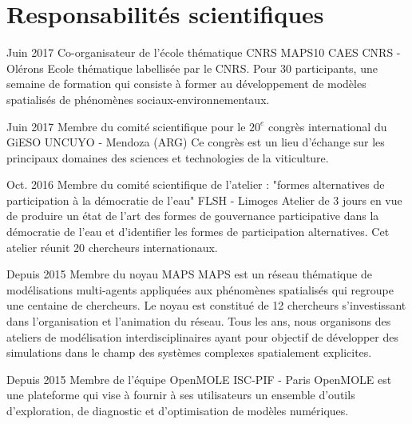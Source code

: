 \documentclass[]{cv-etienne}
\begin{document}
\section{Responsabilités scientifiques}
\begin{entrylist}
\entry
{Juin 2017}
{Co-organisateur de l'école thématique CNRS MAPS10}
{CAES CNRS - Olérons}
{Ecole thématique labellisée par le CNRS. Pour 30 participants, une semaine de formation qui consiste à former au développement de modèles spatialisés de phénomènes sociaux-environnementaux.}
\end{entrylist}
\begin{entrylist}
\entry
{Juin 2017}
{Membre du comité scientifique pour le $20^{e}$ congrès international du GiESO}
{UNCUYO - Mendoza (ARG)}
{Ce congrès est un lieu d'échange sur les principaux domaines des sciences et technologies de la viticulture.}
\end{entrylist}
\begin{entrylist}
\entry
{Oct. 2016}
{Membre du comité scientifique de l'atelier : "formes alternatives de participation à la démocratie de l'eau"}
{FLSH - Limoges}
{Atelier de 3 jours en vue de produire un état de l'art des formes de gouvernance participative dans la démocratie de l'eau et d'identifier les formes de participation alternatives. Cet atelier réunit 20 chercheurs internationaux.}
\end{entrylist}
\begin{entrylist}
\entry
{Depuis 2015}
{Membre du noyau MAPS}
{}
{MAPS est un réseau thématique de modélisations multi-agents appliquées aux phénomènes spatialisés qui regroupe une centaine de chercheurs. Le noyau est constitué de 12 chercheurs s'investissant dans l'organisation et l'animation du réseau. Tous les ans, nous organisons des ateliers de modélisation interdisciplinaires ayant pour objectif de développer des simulations dans le champ des systèmes complexes spatialement explicites.}
\end{entrylist}
\begin{entrylist}
\entry
{Depuis 2015}
{Membre de l'équipe OpenMOLE}
{ISC-PIF - Paris}
{OpenMOLE est une plateforme qui vise à fournir à ses utilisateurs un ensemble d'outils d'exploration, de diagnostic et d'optimisation de modèles numériques.}
\end{entrylist}
\end{document}
